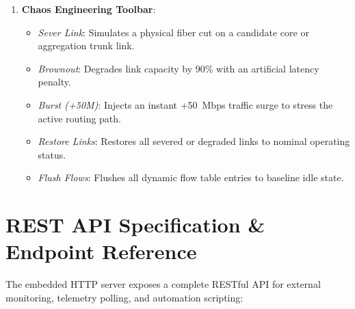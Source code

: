 \begin{enumerate}
    \item \textbf{Chaos Engineering Toolbar}:
    \begin{itemize}
        \item \textit{Sever Link}: Simulates a physical fiber cut on a candidate core or aggregation trunk link.
        \item \textit{Brownout}: Degrades link capacity by 90\% with an artificial latency penalty.
        \item \textit{Burst (+50M)}: Injects an instant +50~Mbps traffic surge to stress the active routing path.
        \item \textit{Restore Links}: Restores all severed or degraded links to nominal operating status.
        \item \textit{Flush Flows}: Flushes all dynamic flow table entries to baseline idle state.
    \end{itemize}
\end{enumerate}

\section{REST API Specification \& Endpoint Reference}
The embedded HTTP server exposes a complete RESTful API for external monitoring, telemetry polling, and automation scripting:

